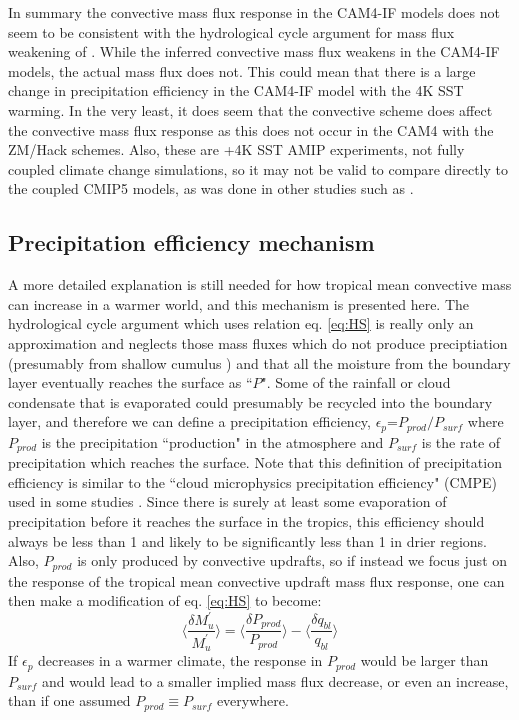 \documentclass[letterpaper,12pt,titlepage,oneside,final]{book}
\begin{document}
In summary the convective mass flux response in the CAM4-IF models does not seem to be consistent with the hydrological cycle argument for mass flux weakening of \citep{held_robust_2006}. While the inferred convective mass flux weakens in the CAM4-IF models, the actual mass flux does not. This could mean that there is a large change in precipitation efficiency in the CAM4-IF model with the 4K SST warming. In the very least, it does seem that the convective scheme does affect the convective mass flux response as this does not occur in the CAM4 with the ZM/Hack schemes. Also, these are +4K SST AMIP experiments, not fully coupled climate change simulations, so it may not be valid to compare directly to the coupled CMIP5 models, as was done in other studies such as \citep{chadwick_spatial_2012}. 

\subsection{Precipitation efficiency mechanism}
A more detailed explanation is still needed for how tropical mean convective mass can increase in a warmer world, and this mechanism is presented here. The hydrological cycle argument which uses relation eq. \ref{eq:HS} is really only an approximation and neglects those mass fluxes which do not produce preciptiation (presumably from shallow cumulus \cite{held_robust_2006}) and that all the moisture from the boundary layer eventually reaches the surface as ``$P$". Some of the rainfall or cloud condensate that is evaporated could presumably be recycled into the boundary layer, and therefore we can define a precipitation efficiency, $\epsilon_{p}$=$P_{prod}/P_{surf}$ where $P_{prod}$ is the precipitation ``production" in the atmosphere and $P_{surf}$ is the rate of precipitation which reaches the surface. Note that this definition of precipitation efficiency is similar to the ``cloud microphysics precipitation efficiency" (CMPE) used in some studies \citep{schoenberg_ferrier_factors_1996,sui_definition_2007}. Since there is surely at least some evaporation of precipitation before it reaches the surface in the tropics, this efficiency should always be less than 1 and likely to be significantly less than 1 in drier regions. Also, $P_{prod}$ is only produced by convective updrafts, so if instead we focus just on the response of the tropical mean convective updraft mass flux response, one can then make a modification of eq. \ref{eq:HS} to become: 
\begin{equation}\label{eq:HS1}
\Bigg\langle\frac{\delta{M^{'}_{u}}}{M^{'}_{u}}\Bigg\rangle=\Bigg\langle\frac{\delta{P_{prod}}}{P_{prod}}\Bigg\rangle-\Bigg\langle\frac{\delta{q_{bl}}}{q_{bl}}\Bigg\rangle
\end{equation}
If $\epsilon_{p}$ decreases in a warmer climate, the response in $P_{prod}$ would be larger than $P_{surf}$ and would lead to a smaller implied mass flux decrease, or even an increase, than if one assumed $P_{prod}\equiv{P_{surf}}$ everywhere. 
\end{document}
